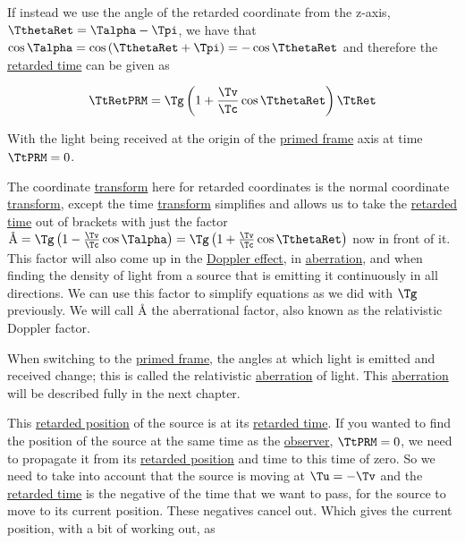 If instead we use the angle of the retarded coordinate from the z-axis, $\TthetaRet  = \Talpha  - \Tpi $, we have that $\cos{\Talpha }=\cos{(\TthetaRet +\Tpi )}=-\cos{\TthetaRet  }$ and therefore the \hyperlink{def-retarded-time}{retarded time} can be given as

\begin{equation}
	\\ { \TtRetPRM  } = \Tg  \left(1 + \frac{\Tv }{\Tc } \cos{\TthetaRet  } \right) { { \TtRet  } }
\end{equation}

With the light being received at the origin of the \hyperlink{def-Primed-Frame}{primed frame} axis at time $\TtPRM  = 0$.

The coordinate \hyperlink{def-transform}{transform} here for retarded coordinates is the normal coordinate \hyperlink{def-transform}{transform}, except the time \hyperlink{def-transform}{transform} simplifies and allows us to take the \hyperlink{def-retarded-time}{retarded time} out of brackets with just the factor $\text{\AA}={\Tg } \left(1-\frac{\Tv }{\Tc } \cos{\Talpha } \right) = \Tg  \left(1 + \frac{\Tv }{\Tc } \cos{\TthetaRet  } \right)$ now in front of it.
This factor will also come up in the \hyperlink{def-doppler-effect}{Doppler effect}, in \hyperlink{def-aberration}{aberration}, and when finding the density of light from a source that is emitting it continuously in all directions.
We can use this factor to simplify equations as we did with $\Tg $ previously.
We will call $\text{\AA}$ the aberrational factor, also known as the relativistic Doppler factor.

When switching to the \hyperlink{def-Primed-Frame}{primed frame}, the angles at which light is emitted and received change; this is called the relativistic \hyperlink{def-aberration}{aberration} of light.
This \hyperlink{def-aberration}{aberration} will be described fully in the next chapter.

\sidenote

This \hyperlink{def-retarded-position}{retarded position} of the source is at its \hyperlink{def-retarded-time}{retarded time}.
If you wanted to find the position of the source at the same time as the \hyperlink{def-observer}{observer}, $\TtPRM =0$, we need to propagate it from its \hyperlink{def-retarded-position}{retarded position} and time to this time of zero.
So we need to take into account that the source is moving at $\Tu  = -\Tv $ and the \hyperlink{def-retarded-time}{retarded time} is the negative of the time that we want to pass, for the source to move to its current position.
These negatives cancel out.
Which gives the current position, with a bit of working out, as

